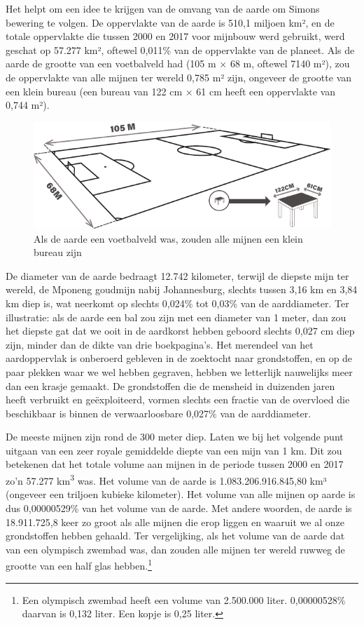 Het helpt om een idee te krijgen van de omvang van de aarde om Simons
bewering te volgen. De oppervlakte van de aarde is 510,1 miljoen km², en
de totale oppervlakte die tussen 2000 en 2017 voor mijnbouw werd
gebruikt, werd geschat op 57.277 km², oftewel 0,011\% van de oppervlakte
van de planeet.\autocite{31} Als de
aarde de grootte van een voetbalveld had (105 m × 68 m, oftewel 7140 m²),
zou de oppervlakte van alle mijnen ter wereld 0,785 m² zijn, ongeveer de
grootte van een klein bureau (een bureau van 122 cm × 61 cm heeft een
oppervlakte van 0,744 m²).

\begin{figure}[!htb]
\centering
    \includegraphics[width=\textwidth]{figures/fig2.pdf}
\caption[Als de aarde een voetbalveld was, zouden alle mijnen
een klein bureau zijn]{Als de aarde een voetbalveld was, zouden alle mijnen
een klein bureau zijn}
\label{fig2}
\end{figure}

De diameter van de aarde bedraagt 12.742 kilometer, terwijl de diepste mijn ter wereld, de Mponeng goudmijn nabij Johannesburg, slechts tussen 3,16 km en 3,84 km diep is, wat neerkomt op slechts 0,024\% tot 0,03\% van de aarddiameter. Ter illustratie: als de aarde een bal zou zijn met een diameter van 1 meter, dan zou het diepste gat dat we ooit in de aardkorst hebben geboord slechts 0,027 cm diep zijn, minder dan de dikte van drie boekpagina’s. Het merendeel van het aardoppervlak is onberoerd gebleven in de zoektocht naar grondstoffen, en op de paar plekken waar we wel hebben gegraven, hebben we letterlijk nauwelijks meer dan een krasje gemaakt. De grondstoffen die de mensheid in duizenden jaren heeft verbruikt en geëxploiteerd, vormen slechts een fractie van de overvloed die beschikbaar is binnen de verwaarloosbare 0,027\% van de aarddiameter.

De meeste mijnen zijn rond de 300 meter diep. Laten we bij het volgende
punt uitgaan van een zeer royale gemiddelde diepte van een mijn van 1
km. Dit zou betekenen dat het totale volume aan mijnen in de periode
tussen 2000 en 2017 zo'n 57.277 km\textsuperscript{3} was. Het volume van de aarde is
1.083.206.916.845,80 km³ (ongeveer een triljoen kubieke kilometer). Het
volume van alle mijnen op aarde is dus 0,00000529\% van het volume van
de aarde. Met andere woorden, de aarde is 18.911.725,8 keer zo groot als
alle mijnen die erop liggen en waaruit we al onze grondstoffen hebben
gehaald. Ter vergelijking, als het volume van de aarde dat van een
olympisch zwembad was, dan zouden alle mijnen ter wereld ruwweg de
grootte van een half glas hebben.\footnote{Een olympisch zwembad heeft een volume van 2.500.000 liter. 0,00000528\% daarvan is 0,132 liter. Een kopje is 0,25 liter.}

